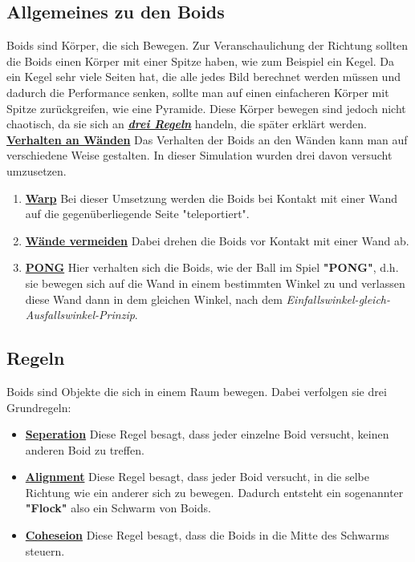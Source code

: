 \documentclass[a4paper, hidelinks, 12pt]{article}
\begin{document}
\subsection{Allgemeines zu den Boids}
Boids sind Körper, die sich Bewegen. Zur Veranschaulichung der Richtung sollten die Boids einen Körper mit einer Spitze haben, wie zum Beispiel ein Kegel. Da ein Kegel sehr viele Seiten hat, die alle jedes Bild berechnet werden müssen und dadurch die Performance senken, sollte man auf einen einfacheren Körper mit Spitze zurückgreifen, wie eine Pyramide. Diese Körper bewegen sind jedoch nicht chaotisch, da sie sich an \hyperref[sec:Regel]{\textbf{\emph{drei Regeln}}} handeln, die später erklärt werden.\linebreak
\newpage
\textbf{\underline{Verhalten an Wänden}}\label{sec:Verhalten}
Das Verhalten der Boids an den Wänden kann man auf verschiedene Weise gestalten. In dieser Simulation wurden drei davon versucht umzusetzen. 
\begin{enumerate}
\item \underline{\textbf{Warp}}\linebreak\label{sec:Warp}
Bei dieser Umsetzung werden die Boids bei Kontakt mit einer Wand auf die gegenüberliegende Seite "teleportiert".
			
\item \underline{\textbf{Wände vermeiden}}\linebreak\label{sec:AvoidWall}
Dabei drehen die Boids vor Kontakt mit einer Wand ab.
			
\item \underline{\textbf{PONG}}\linebreak\label{sec:Pong}
Hier verhalten sich die Boids, wie der Ball im Spiel \textbf{"PONG"}\cite{andysarcade2022}, d.h. sie bewegen sich auf die Wand in einem bestimmten Winkel zu und verlassen diese Wand dann in dem gleichen Winkel, nach dem \emph{Einfallswinkel-gleich-Ausfallswinkel-Prinzip}.
\end{enumerate}

\subsection{Regeln}\label{sec:Regel}
Boids sind Objekte die sich in einem Raum bewegen. Dabei verfolgen sie drei Grundregeln\cite{Lague2022}:
\begin{itemize}
\item\textbf{\underline{Seperation}}\linebreak\label{sec:Seperation}
Diese Regel besagt, dass jeder einzelne Boid versucht, keinen anderen Boid zu treffen. 
\item\textbf{\underline{Alignment}}\linebreak\label{sec:Alignment}
Diese Regel besagt, dass jeder Boid versucht, in die selbe Richtung wie ein anderer sich zu bewegen. Dadurch entsteht ein sogenannter \textbf{"Flock"} also ein Schwarm von Boids.
\item\textbf{\underline{Coheseion}}\linebreak\label{sec:Cohesion}
Diese Regel besagt, dass die Boids in die Mitte des Schwarms steuern.
\end{itemize}
	
\end{document}
